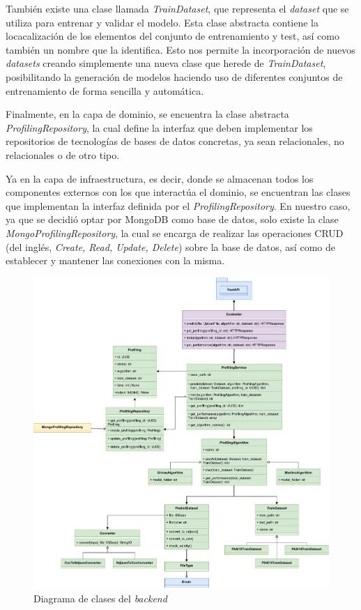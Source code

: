 \bigskip
También existe una clase llamada \textit{TrainDataset}, que representa
el \textit{dataset} que se utiliza para entrenar y validar el modelo. Esta clase abstracta contiene la locacalización de los elementos
del conjunto de entrenamiento y test, así como también un nombre que la identifica. Esto nos permite la incorporación de nuevos \textit{datasets} creando simplemente
una nueva clase que herede de \textit{TrainDataset}, posibilitando la generación de modelos haciendo uso de diferentes conjuntos de entrenamiento de forma sencilla y automática.

\bigskip
Finalmente, en la capa de dominio, se encuentra la clase abstracta \textit{ProfilingRepository}, la cual define la interfaz que deben implementar
los repositorios de tecnologías de bases de datos concretas, ya sean relacionales, no relacionales o de otro tipo.

\bigskip
Ya en la capa de infraestructura, es decir, donde se almacenan todos los componentes externos con los que interactúa el dominio, se encuentran las clases que implementan
la interfaz definida por el \textit{ProfilingRepository}. En nuestro caso, ya que se decidió optar por MongoDB como base de datos, solo existe
la clase \textit{MongoProfilingRepository}, la cual se encarga de realizar las operaciones CRUD (del inglés, \textit{Create, Read, Update, Delete}) sobre la base de datos, así
como de establecer y mantener las conexiones con la misma.

\bigskip
\begin{figure}[H]
	\centering
	\includegraphics[width=\textwidth]{diagramas/clases_back.pdf}
	\caption{Diagrama de clases del \textit{backend}}
	\label{fig:clases_backend}
\end{figure}

